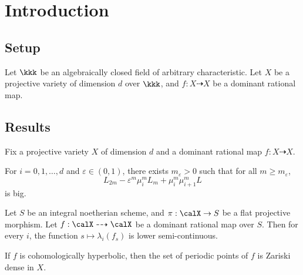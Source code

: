 \section{Introduction}



\subsection{Setup}

  Let $\kkk$ be an algebraically closed field of arbitrary characteristic.
  Let $X$ be a projective variety of dimension $d$ over $\kkk$, and $f: X \dashrightarrow X$ be a dominant rational map.




  
  
  

\subsection{Results}

  Fix a projective variety $X$ of dimension $d$ and a dominant rational map $f: X \dashrightarrow X$. 

  \begin{mainthm}\label{thm:recursive_inequality}
    For $i = 0, 1, \ldots, d$ and $\varepsilon \in (0, 1)$, there exists $m_\varepsilon > 0$ such that for all $m \geq m_\varepsilon$,
    \[  L_{2m} - \varepsilon^m \mu_i^m L_m + \mu_i^m \mu_{i+1}^m L \]
    is big.
  \end{mainthm}

  \begin{mainthm}\label{mainthm:semi-continuity}
    Let $S$ be an integral noetherian scheme, and $\pi: \calX \to S$ be a flat projective morphism. 
    Let $f: \calX \dashrightarrow \calX$ be a dominant rational map over $S$.
    Then for every $i$, the function $s \mapsto \lambda_i(f_s)$ is lower semi-continuous.
  \end{mainthm}

  \begin{mainthm}
    If $f$ is cohomologically hyperbolic, then the set of periodic points of $f$ is Zariski dense in $X$.
  \end{mainthm}
